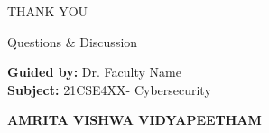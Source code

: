 \documentclass[aspectratio=169]{beamer}
\newcommand{\subjectcode}{21CSE4XX}
\newcommand{\subjectname}{Cybersecurity}
\newcommand{\facultyname}{Dr. Faculty Name}
\begin{document}
\begin{frame}
    \begin{center}
        \Huge{THANK YOU}
        
        \vspace{1cm}
        
        \Large{Questions \& Discussion}
        
        \vspace{1cm}
        
        \textbf{Guided by:} \facultyname \\
        \textbf{Subject:} \subjectcode - \subjectname
        
        \vspace{1cm}
        
        \textcolor{amritared}{\Large \textbf{AMRITA VISHWA VIDYAPEETHAM}}
    \end{center}
\end{frame}
\end{document}
